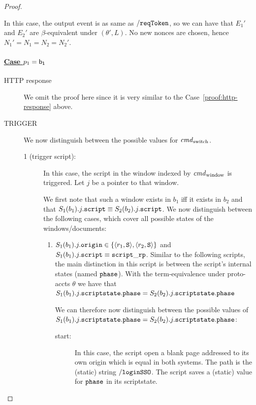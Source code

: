 \begin{theorem}
\begin{proof}
\begin{itemize}
        In this case, the output event is as same as $\mathtt{/reqToken}$, 
        so we can have that $E_1'$ and $E_2'$ are $\beta$-equivalent under $(\theta\prime, L)$.
        No new nonces are chosen, hence $N_1\prime=N_1=N_2=N_2\prime$.
    \end{itemize}

    \paragraph{\underline{Case $p_1 = \mathsf{b_1}$}}

    \begin{description}
      \item[HTTP response] We omit the proof here since it is very similar to the Case~\ref{proof:http-response} above.
      \item[TRIGGER] We now distinguish between the possible values for $\mathit{cmd}_\text{switch}$.
        \begin{description} 
        \item[1 (trigger script):] In this case, the script in the window indexed by $\mathit{cmd}_\text{window}$ is triggered. Let $j$ be a pointer to that window.
            
          We first note that such a window exists in $b_1$ iff it exists in $b_2$ and that $S_1(b_1).j.\mathtt{script} \equiv S_2(b_2).j.\mathtt{script}$. 
          We now distinguish between the following cases, which cover all possible states of the windows/documents:
            
          \begin{enumerate}
          \item $S_1(b_1).j.\mathtt{origin} \in \{\langle r_1,\mathtt{S}\rangle,\langle r_2,\mathtt{S}\rangle\}$ and $S_1(b_1).j.\mathtt{script} \equiv \mathtt{script\_rp}$.
            Similar to the following scripts, the main distinction in this script is between the script's internal states (named $\mathtt{phase}$). 
            With the term-equivalence under proto-accts $\theta$ we have that $S_1(b_1).j.\mathtt{scriptstate}.\mathtt{phase} = S_2(b_2).j.\mathtt{scriptstate}.\mathtt{phase}$ 
              
            We can therefore now distinguish between the possible values of $S_1(b_1).j.\mathtt{scriptstate}.\mathtt{phase} = S_2(b_2).j.\mathtt{scriptstate}.\mathtt{phase}$:
            \begin{description}
            \item[start:] In this case, the script open a blank page addressed to its own origin which is equal in both systems.
              The path is the (static) string $\mathtt{/loginSSO}$. 
              The script saves a (static) value for $\mathtt{phase}$ in its scriptstate.
      

\end{description}
\end{enumerate}
\end{description}
\end{description}
\end{proof}
\end{theorem}
